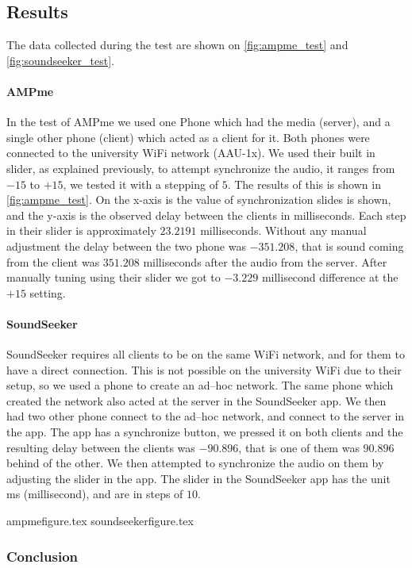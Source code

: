 \subsection{Results}
The data collected during the test are shown on \cref{fig:ampme_test} and \cref{fig:soundseeker_test}.

\paragraph{AMPme}
In the test of AMPme we used one Phone which had the media (server), and a single other phone (client) which acted as a client for it. 
Both phones were connected to the university WiFi network (AAU-1x).
We used their built in slider, as explained previously, to attempt synchronize the audio, it ranges from $-15$ to $+15$, we tested it with a stepping of $5$. 
The results of this is shown in \cref{fig:ampme_test}.
On the x-axis is the value of synchronization slides is shown, and the y-axis is the observed delay between the clients in milliseconds.
Each step in their slider is approximately $23.2191$ milliseconds.
Without any manual adjustment the delay between the two phone was $-351.208$, that is sound coming from the client was $351.208$ milliseconds after the audio from the server. 
After manually tuning using their slider we got to $-3.229$ millisecond difference at the $+15$ setting.  

\paragraph{SoundSeeker}
SoundSeeker requires all clients to be on the same WiFi network, and for them to have a direct connection. 
This is not possible on the university WiFi due to their setup, so we used a phone to create an ad--hoc network. 
The same phone which created the network also acted at the server in the SoundSeeker app. 
We then had two other phone connect to the ad--hoc network, and connect to the server in the app.
The app has a synchronize button, we pressed it on both clients and the resulting delay between the clients was $-90.896$, that is one of them was $90.896$ behind of the other. 
We then attempted to synchronize the audio on them by adjusting the slider in the app.
The slider in the SoundSeeker app has the unit ms (millisecond), and are in steps of $10$.  


{ampmefigure.tex}
{soundseekerfigure.tex}

\subsubsection*{Conclusion}

